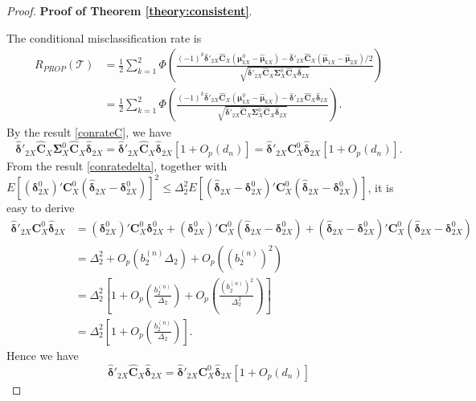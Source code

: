 \documentclass[12pt]{article}
\begin{document}
\begin{proof}{\textbf{Proof of Theorem \ref{theory:consistent}}.}{}

The conditional misclassification rate is
\begin{align*}
R_{PROP}(\mathcal{T}) &= \frac{1}{2} \sum_{k=1}^2 \Phi \left(\frac{(-1)^k \hat{\bm \delta}'_{2X} \hat{\bm C}_X (\bm \mu_{kX}^0 - \hat{\bm \mu}_{kX}) - \hat{\bm \delta}'_{2X} \hat{\bm C}_X (\hat{\bm \mu}_{1X} - \hat{\bm \mu}_{2X}) / 2 }{\sqrt{\hat{\bm \delta}'_{2X} \hat{\bm C}_X \bm \Sigma_X^0 \hat{\bm C}_X \hat{\bm \delta}_{2X} }} \right) \\
&= \frac{1}{2} \sum_{k=1}^2 \Phi \left(\frac{(-1)^k \hat{\bm \delta}'_{2X} \hat{\bm C}_X (\bm \mu_{kX}^0 - \hat{\bm \mu}_{kX}) - \hat{\bm \delta}'_{2X} \hat{\bm C}_X \hat{\bm \delta}_{2X} }{\sqrt{\hat{\bm \delta}'_{2X} \hat{\bm C}_X \bm \Sigma_X^0 \hat{\bm C}_X \hat{\bm \delta}_{2X} }} \right).
\end{align*}
By the result \eqref{conrateC}, we have
\begin{equation*}
\hat{\bm \delta}'_{2X} \hat{\bm C}_X \bm \Sigma_X^0 \hat{\bm C}_X \hat{\bm \delta}_{2X} = \hat{\bm \delta}'_{2X} \hat{\bm C}_X \hat{\bm \delta}_{2X} [1 + O_p(d_n)] = \hat{\bm \delta}'_{2X} \bm C_X^0 \hat{\bm \delta}_{2X} [1 + O_p(d_n)].
\end{equation*}
From the result \eqref{conratedelta}, together with $E[ (\bm \delta_{2X}^0)' \bm C_X^0 (\hat{\bm \delta}_{2X} - \bm \delta_{2X}^0)]^2 \leq \Delta_2^2 E[(\hat{\bm \delta}_{2X} - \bm \delta_{2X}^0)' \bm C_X^0 (\hat{\bm \delta}_{2X} - \bm \delta_{2X}^0)]$, it is easy to derive
\begin{align*}
\hat{\bm \delta}'_{2X} \bm C_X^0 \hat{\bm \delta}_{2X} &= (\bm \delta_{2X}^0)' \bm C_X^0 \bm \delta_{2X}^0 + (\bm \delta_{2X}^0)' \bm C_X^0 (\hat{\bm \delta}_{2X} - \bm \delta_{2X}^0) + (\hat{\bm \delta}_{2X} - \bm \delta_{2X}^0)' \bm C_X^0 (\hat{\bm \delta}_{2X} - \bm \delta_{2X}^0) \\
&= \Delta_2^2 + O_p(b_2^{(n)} \Delta_2) + O_p((b_2^{(n)})^2) \\
&= \Delta_2^2 [1 + O_p(\frac{b_2^{(n)}}{\Delta_2}) + O_p(\frac{(b_2^{(n)})^2}{\Delta_2^2})] \\
&= \Delta_2^2 [1 + O_p(\frac{b_2^{(n)}}{\Delta_2})].
\end{align*}
Hence we have
\begin{equation*}
\hat{\bm \delta}'_{2X} \hat{\bm C}_X \hat{\bm \delta}_{2X}
= \hat{\bm \delta}'_{2X} \bm C_X^0 \hat{\bm \delta}_{2X} [1 + O_p(d_n)]

\end{equation*}
\end{proof}
\end{document}
